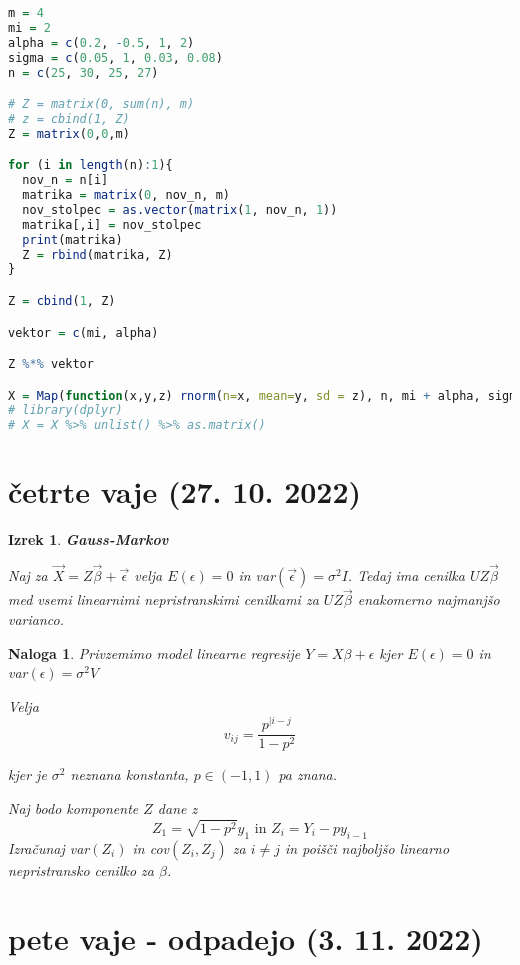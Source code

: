 \documentclass{homework}
\newtheorem{exercise}{Naloga}
\newtheorem{theorem}{Izrek}
\begin{document}
\begin{lstlisting}[language=R]
  m = 4
mi = 2
alpha = c(0.2, -0.5, 1, 2)
sigma = c(0.05, 1, 0.03, 0.08)
n = c(25, 30, 25, 27)

# Z = matrix(0, sum(n), m)
# z = cbind(1, Z)
Z = matrix(0,0,m)

for (i in length(n):1){
  nov_n = n[i]
  matrika = matrix(0, nov_n, m)
  nov_stolpec = as.vector(matrix(1, nov_n, 1))
  matrika[,i] = nov_stolpec
  print(matrika)
  Z = rbind(matrika, Z)
}

Z = cbind(1, Z)

vektor = c(mi, alpha)

Z %*% vektor

X = Map(function(x,y,z) rnorm(n=x, mean=y, sd = z), n, mi + alpha, sigma)
# library(dplyr)
# X = X %>% unlist() %>% as.matrix()  
\end{lstlisting}
\pagebreak
\section{četrte vaje (27. 10. 2022)}
\begin{theorem}
  \textbf{Gauss-Markov}

  Naj za $\vec{X} = Z\vec{\beta} + \vec{\epsilon}$ velja $E(\epsilon) = 0$ in var$(\vec{\epsilon}) = \sigma^2 I $.
  Tedaj ima cenilka $UZ\vec{\beta}$ med vsemi linearnimi nepristranskimi cenilkami za $UZ\vec{\beta}$ enakomerno najmanjšo varianco. 

\end{theorem}

\begin{exercise}
Privzemimo model linearne regresije $Y = X\beta + \epsilon$ kjer $E(\epsilon) = 0$ in var$(\epsilon) = \sigma^2V$

Velja 
$$v_{ij} = \frac{p^{|i-j}}{1-p^2}$$

kjer je $\sigma^2$ neznana konstanta, $p \in (-1, 1)$ pa znana.

Naj bodo komponente $Z$ dane z
$$Z_1 = \sqrt{1 - p^2}y_1 \text{  in  } Z_i = Y_i - py_{i-1}$$
Izračunaj var$(Z_i)$ in cov$(Z_i, Z_j)$ za $i \neq j$ in poišči najboljšo linearno nepristransko cenilko za $\beta$.

\end{exercise}

\section{pete vaje - odpadejo (3. 11. 2022)}
\end{document}
